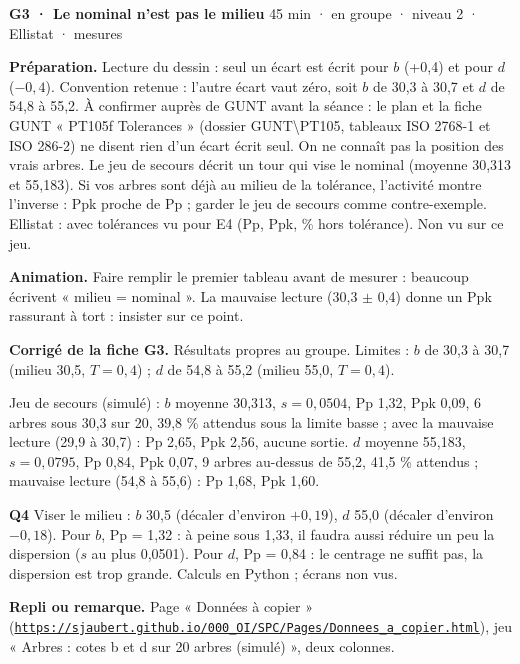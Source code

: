 \vspace{3pt}
\begin{tcolorbox}[act]\textbf{G3 · Le nominal n'est pas le milieu} \hfill {\small 45 min · en groupe · niveau 2 · Ellistat · mesures}\end{tcolorbox}
\textbf{Préparation.} Lecture du dessin : seul un écart est écrit pour $b$ (+0,4) et pour $d$ ($-0{,}4$). Convention retenue : l'autre écart vaut zéro, soit $b$ de 30,3 à 30,7 et $d$ de 54,8 à 55,2. À confirmer auprès de GUNT avant la séance : le plan et la fiche GUNT « PT105f Tolerances » (dossier GUNT\textbackslash PT105, tableaux ISO 2768-1 et ISO 286-2) ne disent rien d'un écart écrit seul. On ne connaît pas la position des vrais arbres. Le jeu de secours décrit un tour qui vise le nominal (moyenne 30,313 et 55,183). Si vos arbres sont déjà au milieu de la tolérance, l'activité montre l'inverse : Ppk proche de Pp ; garder le jeu de secours comme contre-exemple. Ellistat :  avec tolérances vu pour E4 (Pp, Ppk, \% hors tolérance). Non vu sur ce jeu.\par
\textbf{Animation.} Faire remplir le premier tableau avant de mesurer : beaucoup écrivent « milieu = nominal ». La mauvaise lecture (30,3 $\pm$ 0,4) donne un Ppk rassurant à tort : insister sur ce point.\par
\textbf{\color{ok}Corrigé de la fiche G3.} Résultats propres au groupe. Limites : $b$ de 30,3 à 30,7 (milieu 30,5, $T = 0{,}4$) ; $d$ de 54,8 à 55,2 (milieu 55,0, $T = 0{,}4$).\par Jeu de secours (simulé) : $b$ moyenne 30,313, $s = 0{,}0504$, Pp 1,32, Ppk 0,09, 6 arbres sous 30,3 sur 20, 39,8 \% attendus sous la limite basse ; avec la mauvaise lecture (29,9 à 30,7) : Pp 2,65, Ppk 2,56, aucune sortie. $d$ moyenne 55,183, $s = 0{,}0795$, Pp 0,84, Ppk 0,07, 9 arbres au-dessus de 55,2, 41,5 \% attendus ; mauvaise lecture (54,8 à 55,6) : Pp 1,68, Ppk 1,60.\par \textbf{Q4} Viser le milieu : $b$ 30,5 (décaler d'environ $+0{,}19$), $d$ 55,0 (décaler d'environ $-0{,}18$). Pour $b$, Pp = 1,32 : à peine sous 1,33, il faudra aussi réduire un peu la dispersion ($s$ au plus 0,0501). Pour $d$, Pp = 0,84 : le centrage ne suffit pas, la dispersion est trop grande. Calculs en Python ; écrans non vus.\par
{\small\textbf{Repli ou remarque.} Page « Données à copier » (\href{https://sjaubert.github.io/000_OI/SPC/Pages/Donnees_a_copier.html}{\nolinkurl{https://sjaubert.github.io/000_OI/SPC/Pages/Donnees_a_copier.html}}), jeu « Arbres : cotes b et d sur 20 arbres (simulé) », deux colonnes.}\par

